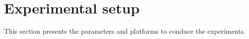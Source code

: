 \documentclass[final,1p,times]{elsarticle}
\begin{document}



\section{Experimental setup}
\label{sec:experiments}
This section presents the parameters and platforms to conduce the experiments. 
\end{document}
